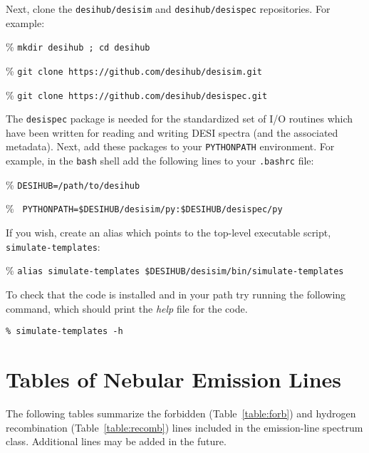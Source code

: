 \documentclass[12pt]{article}
\newcommand{\simt}{{\tt simulate-templates}}
\begin{document}
\noindent Next, clone the {\tt desihub/desisim} and {\tt desihub/desispec}
repositories.  For example:
\begin{itemize*}
  \item[\%]{{\tt mkdir desihub ; cd desihub}}
  \item[\%]{{\tt git clone https://github.com/desihub/desisim.git}}
  \item[\%]{{\tt git clone https://github.com/desihub/desispec.git}}
\end{itemize*}

\noindent The {\tt desispec} package is needed for the standardized set of I/O
routines which have been written for reading and writing DESI spectra (and the
associated metadata).  Next, add these packages to your {\tt PYTHONPATH}
environment.  For example, in the {\tt bash} shell add the following lines to
your {\tt .bashrc} file:
\begin{itemize*}
  \item[\%]{{\tt DESIHUB=/path/to/desihub}}
  \item[\%]{{\tt
      PYTHONPATH=\$DESIHUB/desisim/py:\$DESIHUB/desispec/py}}
\end{itemize*}

\noindent If you wish, create an alias which points to the top-level executable
script, \simt:
\begin{itemize*}
  \item[\%]{{\tt alias \simt{} \$DESIHUB/desisim/bin/\simt}}
\end{itemize*}


To check that the code is installed and in your path try running the following
command, which should print the \emph{help} file for the code.

\begin{verbatim}
% simulate-templates -h
\end{verbatim}


\clearpage
\section{Tables of Nebular Emission Lines}

The following tables summarize the forbidden (Table~\ref{table:forb}) and
hydrogen recombination (Table~\ref{table:recomb}) lines included in the
emission-line spectrum class.  Additional lines may be added in the future. 
\end{document}
